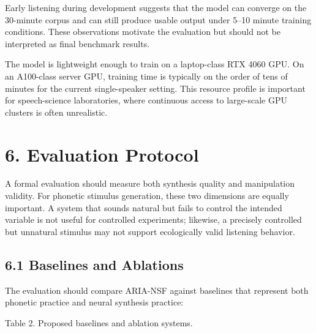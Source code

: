 Early listening during development suggests that the model can converge
on the 30-minute corpus and can still produce usable output under 5--10
minute training conditions. These observations motivate the evaluation
but should not be interpreted as final benchmark results.

The model is lightweight enough to train on a laptop-class RTX 4060 GPU.
On an A100-class server GPU, training time is typically on the order of
tens of minutes for the current single-speaker setting. This resource
profile is important for speech-science laboratories, where continuous
access to large-scale GPU clusters is often unrealistic.

\section{6. Evaluation Protocol}\label{evaluation-protocol}

A formal evaluation should measure both synthesis quality and
manipulation validity. For phonetic stimulus generation, these two
dimensions are equally important. A system that sounds natural but fails
to control the intended variable is not useful for controlled
experiments; likewise, a precisely controlled but unnatural stimulus may
not support ecologically valid listening behavior.

\subsection{6.1 Baselines and Ablations}\label{baselines-and-ablations}

The evaluation should compare ARIA-NSF against baselines that represent
both phonetic practice and neural synthesis practice:

Table 2. Proposed baselines and ablation systems.

